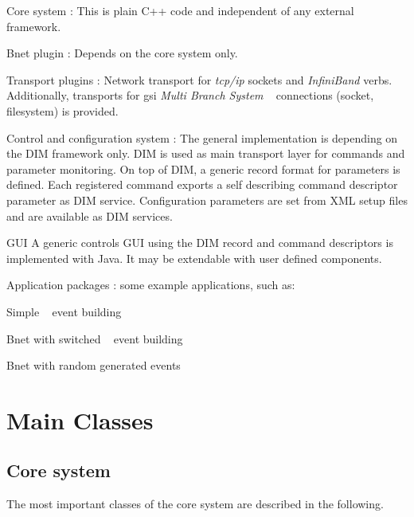\begin{compactdesc}
\item [Core system] : This is plain C++ code and independent of any external framework.
\item [Bnet plugin] : Depends on the core system only.
\item [Transport plugins] :  Network transport for  \textit{tcp/ip} sockets and \textit{InfiniBand} verbs. Additionally, 
transports for gsi \textit{Multi Branch System} \mbs~ connections (socket, filesystem) is provided.
\item [Control and configuration system]: The general implementation is depending on the DIM framework only.
DIM is used as main transport layer for commands and parameter monitoring.  On top of DIM, a generic record format for parameters is defined. Each registered command exports a self describing command descriptor  parameter as DIM service. Configuration parameters are set from XML setup files and are 
available as DIM services.      
\item  [GUI] A generic controls GUI using the DIM record and command descriptors is 
      implemented with Java. It may be extendable with user defined components.
\item[Application packages] : some example applications, such as: 
\begin{compactitem}[$\circ$]
\item  Simple \mbs~ event building
\item  Bnet with switched \mbs~ event building
\item  Bnet with random generated events
\end{compactitem}

      
\end{compactdesc}   






\section{Main Classes}
\subsection{Core system}
\label{prog_core_classes}
The most important classes of the \dabc core system are described in the following.


